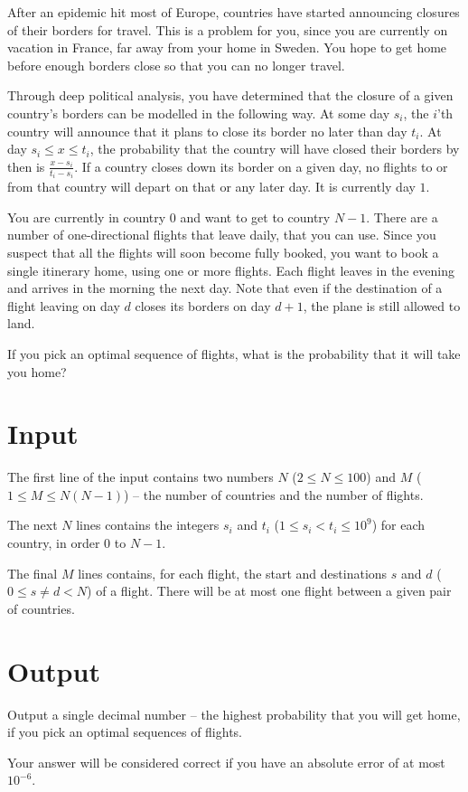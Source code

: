 After an epidemic hit most of Europe, countries have started announcing closures of their borders for travel.
This is a problem for you, since you are currently on vacation in France, far away from your home in Sweden.
You hope to get home before enough borders close so that you can no longer travel.

Through deep political analysis, you have determined that the closure of a given country's borders can be modelled in the following way.
At some day $s_i$, the $i$'th country will announce that it plans to close its border no later than day $t_i$.
At day $s_i \le x \le t_i$, the probability that the country will have closed their borders by then is $\frac{x - s_i}{t_i - s_i}$.
If a country closes down its border on a given day, no flights to or from that country will depart on that or any later day.
It is currently day $1$.

You are currently in country $0$ and want to get to country $N - 1$.
There are a number of one-directional flights that leave daily, that you can use.
Since you suspect that all the flights will soon become fully booked, you want to book a single itinerary home, using one or more flights.
Each flight leaves in the evening and arrives in the morning the next day.
Note that even if the destination of a flight leaving on day $d$ closes its borders on day $d + 1$, the plane is still allowed to land.

If you pick an optimal sequence of flights, what is the probability that it will take you home?

\section*{Input}
The first line of the input contains two numbers $N$ ($2 \le N \le 100$) and $M$ ($1 \le M \le N(N-1)$)  -- the number of countries and the number of flights.

The next $N$ lines contains the integers $s_i$ and $t_i$ ($1 \le s_i < t_i \le 10^9$) for each country, in order $0$ to $N - 1$.

The final $M$ lines contains, for each flight, the start and destinations $s$ and $d$ ($0 \le s \neq d < N$) of a flight.
There will be at most one flight between a given pair of countries.

\section*{Output}
Output a single decimal number -- the highest probability that you will get home, if you pick an optimal sequences of flights.

Your answer will be considered correct if you have an absolute error of at most ${10}^{-6}$.
